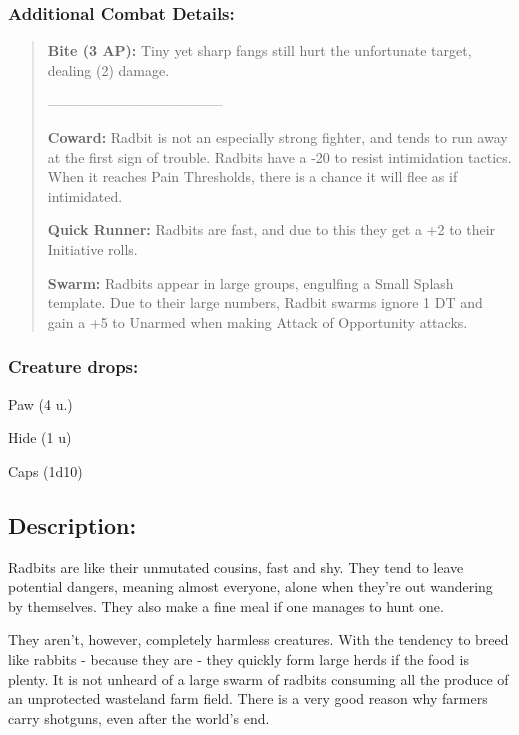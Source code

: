 \documentclass[11pt,a4paper,twocolumn]{book}
\begin{document}
	\subsubsection*{Additional Combat Details:}
	\begin{verse}
		\textbf{Bite (3 AP):} Tiny yet sharp fangs still hurt the unfortunate target, dealing (2) damage.
		
	--------------------------------------	
		
		\textbf{Coward:} Radbit is not an especially strong fighter, and tends to run away at the first sign of trouble. Radbits have a -20 to resist intimidation tactics. When it reaches Pain Thresholds, there is a chance it will flee as if intimidated.
	
		\textbf{Quick Runner:} Radbits are fast, and due to this they get a +2 to their Initiative rolls.
		
		\textbf{Swarm:} Radbits appear in large groups, engulfing a Small Splash template. Due to their large numbers, Radbit swarms ignore 1 DT and gain a +5 to Unarmed when making Attack of Opportunity attacks.
		
%		
	\end{verse}
	
	\subsubsection*{Creature drops:}
	\begin{compactitem}
		\item Paw (4 u.)
		\item Hide (1 u)
		\item Caps (1d10)
	\end{compactitem}
	
	\subsection*{Description:}
	Radbits are like their unmutated cousins, fast and shy. They tend to leave potential dangers, meaning almost everyone, alone when they're out wandering by themselves. They also make a fine meal if one manages to hunt one.
	
	They aren't, however, completely harmless creatures. With the tendency to breed like rabbits - because they are - they quickly form large herds if the food is plenty. It is not unheard of a large swarm of radbits consuming all the produce of an unprotected wasteland farm field. There is a very good reason why farmers carry shotguns, even after the world's end.
	
\end{document}
